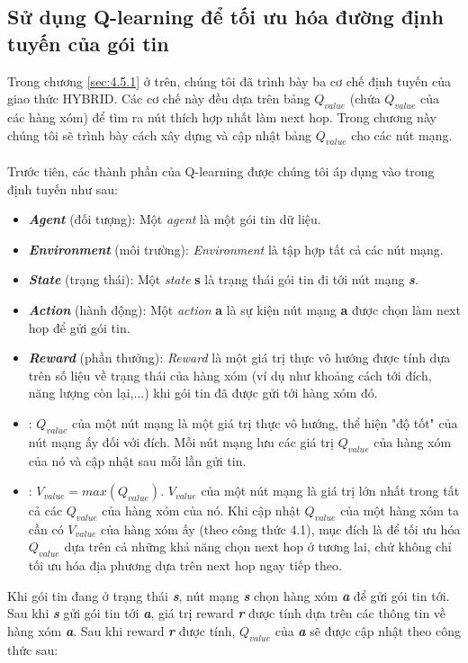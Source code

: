 \documentclass[12pt]{report}
\begin{document}
\subsection{Sử dụng Q-learning để tối ưu hóa đường định tuyến của gói tin}
\label{sec:4.5.2}
Trong chương \ref{sec:4.5.1} ở trên, chúng tôi đã trình bày ba cơ chế định tuyến của giao thức HYBRID. Các cơ chế này đều dựa trên bảng $Q_{value}$ (chứa $Q_{value}$ của các hàng xóm) để tìm ra nút thích hợp nhất làm next hop. Trong chương này chúng tôi sẽ trình bày cách xây dựng và cập nhật bảng $Q_{value}$ cho các nút mạng.\\  \\
Trước tiên, các thành phần của Q-learning được chúng tôi áp dụng vào trong định tuyến như sau:
\begin{itemize}
\item \textbf{\textit{Agent}} (đối tượng): Một \textit{agent} là một gói tin dữ liệu.
\item \textbf{\textit{Environment}} (môi trường): \textit{Environment} là tập hợp tất cả các nút mạng.
\item \textbf{\textit{State}} (trạng thái): Một \textit{state} \textbf{s} là trạng thái gói tin đi tới nút mạng \textbf{\textit{s}}.
\item \textbf{\textit{Action}} (hành động): Một \textit{action} \textbf{a} là sự kiện nút mạng \textbf{a} được chọn làm next hop để gửi gói tin.
\item \textbf{\textit{Reward}} (phần thưởng): \textit{Reward} là một giá trị thực vô hướng được tính dựa trên số liệu về trạng thái của hàng xóm (ví dụ như khoảng cách tới đích, năng lượng còn lại,...) khi gói tin đã được gửi tới hàng xóm đó. 
\item {}: $Q_{value}$ của một nút mạng là một giá trị thực vô hướng, thể hiện "độ tốt" của nút mạng ấy đối với đích. Mỗi nút mạng lưu các giá trị $Q_{value}$ của hàng xóm của nó và cập nhật sau mỗi lần gửi tin.
\item {}: $V_{value} = max(Q_{value})$. $V_{value}$ của một nút mạng là giá trị lớn nhất trong tất cả các $Q_{value}$ của hàng xóm của nó. Khi cập nhật $Q_{value}$ của một hàng xóm ta cần có $V_{value}$ của hàng xóm ấy (theo công thức 4.1), mục đích là để tối ưu hóa $Q_{value}$ dựa trên cả những khả năng chọn next hop ở tương lai, chứ không chỉ tối ưu hóa địa phương dựa trên next hop ngay tiếp theo.
\end{itemize} 
Khi gói tin đang ở trạng thái \textbf{\textit{s}}, nút mạng \textbf{\textit{s}} chọn hàng xóm \textbf{\textit{a}} để gửi gói tin tới. Sau khi \textbf{\textit{s}} gửi gói tin tới \textbf{\textit{a}}, giá trị reward \textbf{\textit{r}} được tính dựa trên các thông tin về hàng xóm \textbf{\textit{a}}. Sau khi reward \textbf{\textit{r}} được tính, $Q_{value}$ của \textbf{\textit{a}} sẽ được cập nhật theo công thức sau:
\end{document}
